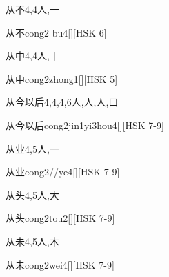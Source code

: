\begin{Entry}{从不}{4,4}{⼈,⼀}
  \begin{Phonetics}{从不}{cong2 bu4}[][HSK 6]
  \end{Phonetics}
\end{Entry}

\begin{Entry}{从中}{4,4}{⼈,⼁}
  \begin{Phonetics}{从中}{cong2zhong1}[][HSK 5]
  \end{Phonetics}
\end{Entry}

\begin{Entry}{从今以后}{4,4,4,6}{⼈,⼈,⼈,⼝}
  \begin{Phonetics}{从今以后}{cong2jin1yi3hou4}[][HSK 7-9]
  \end{Phonetics}
\end{Entry}

\begin{Entry}{从业}{4,5}{⼈,⼀}
  \begin{Phonetics}{从业}{cong2//ye4}[][HSK 7-9]
  \end{Phonetics}
\end{Entry}

\begin{Entry}{从头}{4,5}{⼈,⼤}
  \begin{Phonetics}{从头}{cong2tou2}[][HSK 7-9]
  \end{Phonetics}
\end{Entry}

\begin{Entry}{从未}{4,5}{⼈,⽊}
  \begin{Phonetics}{从未}{cong2wei4}[][HSK 7-9]
  \end{Phonetics}
\end{Entry}

